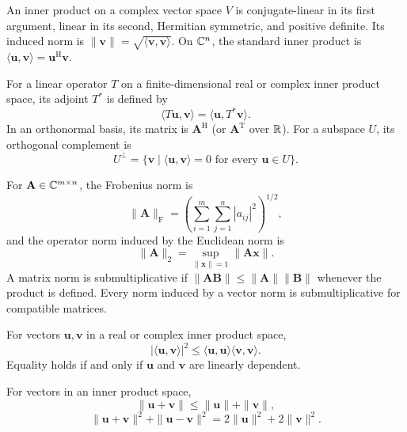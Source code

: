 \begin{definition}
An inner product on a complex vector space $V$ is conjugate-linear in its first argument, linear in its second, Hermitian symmetric, and positive definite. Its induced norm is $\|\mathbf{v}\|=\sqrt{\langle\mathbf{v},\mathbf{v}\rangle}$. On $\mathbb{C}^n$, the standard inner product is $\langle\mathbf{u},\mathbf{v}\rangle=\mathbf{u}^{\mathrm{H}}\mathbf{v}$.
\end{definition}

\begin{definition}
For a linear operator $T$ on a finite-dimensional real or complex inner product space, its adjoint $T^*$ is defined by
\[
 \langle T\mathbf{u},\mathbf{v}\rangle=\langle\mathbf{u},T^*\mathbf{v}\rangle.
\]
In an orthonormal basis, its matrix is $\mathbf{A}^{\mathrm{H}}$ (or $\mathbf{A}^{\mathrm{T}}$ over $\mathbb{R}$). For a subspace $U$, its orthogonal complement is
\[
 U^\perp=\{\mathbf{v}\mid\langle\mathbf{u},\mathbf{v}\rangle=0
 \text{ for every }\mathbf{u}\in U\}.
\]
\end{definition}
\begin{definition}
For $\mathbf{A}\in\mathbb{C}^{m\times n}$, the Frobenius norm is
\[
 \|\mathbf{A}\|_{\mathrm F}
 =\left(\sum_{i=1}^m\sum_{j=1}^n|a_{ij}|^2\right)^{1/2},
\]
and the operator norm induced by the Euclidean norm is
\[
 \|\mathbf{A}\|_2=\sup_{\|\mathbf{x}\|=1}\|\mathbf{A}\mathbf{x}\|.
\]
A matrix norm is submultiplicative if $\|\mathbf{A}\mathbf{B}\|\le\|\mathbf{A}\|\|\mathbf{B}\|$ whenever the product is defined. Every norm induced by a vector norm is submultiplicative for compatible matrices.
\end{definition}

\begin{theorem}
For vectors $\mathbf{u},\mathbf{v}$ in a real or complex inner product space,
\[
 |\langle\mathbf{u},\mathbf{v}\rangle|^2
 \le\langle\mathbf{u},\mathbf{u}\rangle\langle\mathbf{v},\mathbf{v}\rangle.
\]
Equality holds if and only if $\mathbf{u}$ and $\mathbf{v}$ are linearly dependent.
\end{theorem}

\begin{theorem}
For vectors in an inner product space,
\[
 \|\mathbf{u}+\mathbf{v}\|\le\|\mathbf{u}\|+\|\mathbf{v}\|,
\]
\[
 \|\mathbf{u}+\mathbf{v}\|^2+\|\mathbf{u}-\mathbf{v}\|^2
 =2\|\mathbf{u}\|^2+2\|\mathbf{v}\|^2.
\]
\end{theorem}

